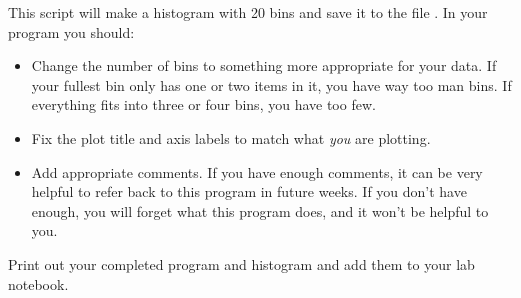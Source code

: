 \documentclass[twoside,11pt,ShortChapTitles]{BYUTextbook}
\begin{document}
This script will make a histogram with 20 bins and save it to the file .  In your program you should:
\begin{itemize}
\item Change the number of bins to something more appropriate for your data. If your fullest bin only has one or two items in it, you have way too man bins.  If everything fits into three or four bins, you have too few.
\item Fix the plot title and axis labels to match what {\em you} are plotting.
\item Add appropriate comments. If you have enough comments, it can be very helpful to refer back to this program in future weeks.  If you don't have enough, you will forget what this program does, and it won't be helpful to you.
\end{itemize}

Print out your completed program and histogram and add them to your lab notebook.
\end{document}
